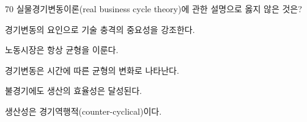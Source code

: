 \begin{question}{70}
실물경기변동이론(real business cycle theory)에 관한 설명으로 옳지 않은 것은?
\begin{choices}
  \item 경기변동의 요인으로 기술 충격의 중요성을 강조한다.
  \item 노동시장은 항상 균형을 이룬다.
  \item 경기변동은 시간에 따른 균형의 변화로 나타난다.
  \item 불경기에도 생산의 효율성은 달성된다.
  \item 생산성은 경기역행적(counter-cyclical)이다.
\end{choices}
\end{question}

